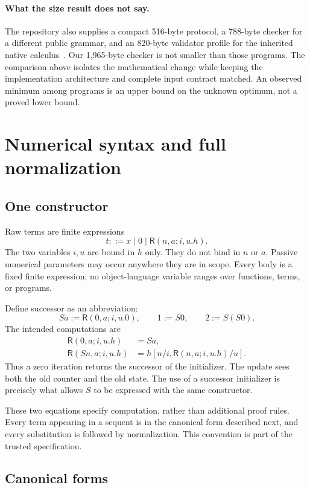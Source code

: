 \documentclass[11pt]{article}
\theoremstyle{definition}
\theoremstyle{remark}
\newcommand{\R}{\mathsf R}
\begin{document}
\paragraph{What the size result does not say.}
The repository also supplies a compact 516-byte protocol, a 788-byte
checker for a different public grammar, and an 820-byte validator
profile for the inherited native calculus~\cite{canonical,checked,specialization}.
Our 1,965-byte checker is not smaller than those programs.
The comparison above isolates the mathematical change while keeping
the implementation architecture and complete input contract matched.
An observed minimum among programs is an upper bound on the unknown
optimum, not a proved lower bound.

\section{Numerical syntax and full normalization}
\label{sec:syntax}

\subsection{One constructor}

Raw terms are finite expressions
\[
 t ::= x\mid 0\mid \R(n,a;i,u.h).
\]
The two variables $i,u$ are bound in $h$ only. They do not bind in
$n$ or $a$. Passive numerical parameters may occur anywhere they
are in scope. Every body is a fixed finite expression; no
object-language variable ranges over functions, terms, or programs.

Define successor as an abbreviation:
\[
 Sa:=\R(0,a;i,u.0),\qquad 1:=S0,\qquad 2:=S(S0).
\]
The intended computations are
\begin{align}
 \R(0,a;i,u.h)&=Sa, \label{eq:r0}\\
 \R(Sn,a;i,u.h)&=
 h[n/i,\R(n,a;i,u.h)/u]. \label{eq:rs}
\end{align}
Thus a zero iteration returns the successor of the initializer.
The update sees both the old counter and the old state.
The use of a successor initializer is precisely what allows $S$
to be expressed with the same constructor.

These two equations specify computation, rather than additional
proof rules. Every term appearing in a sequent is in the canonical
form described next, and every substitution is followed by
normalization. This convention is part of the trusted specification.

\subsection{Canonical forms}
\end{document}
